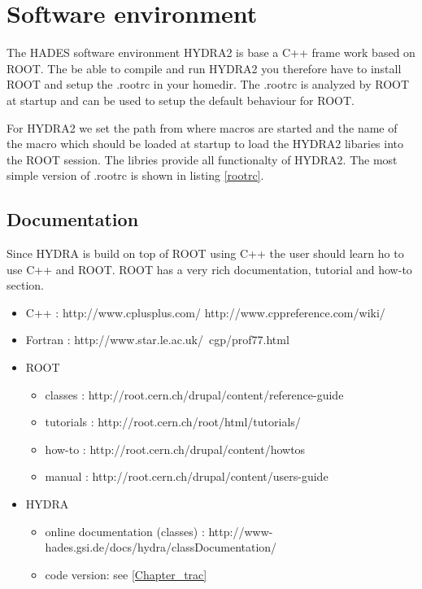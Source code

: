 \chapter{Software environment}


The HADES software environment HYDRA2 is base a C++ frame work based
on ROOT. The be able to compile and run HYDRA2 you therefore have to 
install ROOT and setup the .rootrc in your homedir.
The .rootrc is analyzed by ROOT at startup and can be used to setup
the default behaviour for ROOT. 

For HYDRA2 we set the path from where macros are started and the name
of the macro which should be loaded at startup to load the HYDRA2 libaries
into the ROOT session. The libries provide all functionalty of HYDRA2.
The most simple version of .rootrc is shown in listing \ref{rootrc}.






\section{Documentation}

Since HYDRA is build on top of ROOT using C++ the user should
learn ho to use C++ and ROOT. ROOT has a very rich documentation, 
tutorial and how-to section.


\begin{itemize}

\item C++ : http://www.cplusplus.com/
      \newline
       http://www.cppreference.com/wiki/

\item Fortran  :   http://www.star.le.ac.uk/~cgp/prof77.html

\item ROOT 
       \begin{itemize}
       \item classes :	http://root.cern.ch/drupal/content/reference-guide
       \item tutorials : http://root.cern.ch/root/html/tutorials/
       \item how-to : http://root.cern.ch/drupal/content/howtos
       \item manual : http://root.cern.ch/drupal/content/users-guide
       \end{itemize}
\item HYDRA 
  \begin{itemize}
    \item online documentation (classes) :  http://www-hades.gsi.de/docs/hydra/classDocumentation/
    \item code version: see \ref{Chapter_trac}
   \end{itemize}
\end{itemize}

